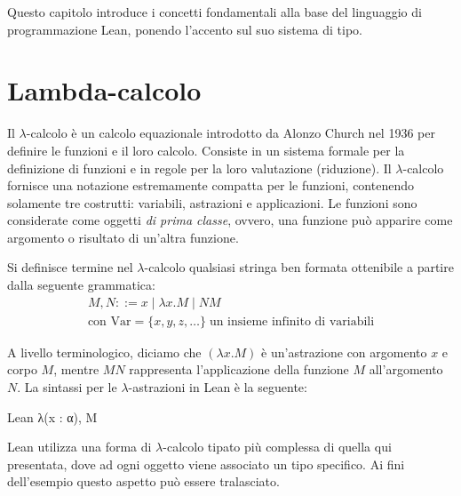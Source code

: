 Questo capitolo introduce i concetti fondamentali alla base del linguaggio di programmazione Lean, ponendo l'accento sul suo sistema di tipo.

\section{Lambda-calcolo}
\begin{comment}
Il $\lambda$-calcolo nasce come conseguenza al tentativo di fomalizzazione della nozione di algoritmo nella prima metà del '900. Uno degli obiettivi del programma di Hilbert era quello di risolvere l'\emph{Entscheidungsproblem} (problema della decisione), ovvero fornire una procedura calcolabile (un algoritmo) per determinare la verità o meno di qualsiasi proposizione formulata nel linguaggio della logica del prim'ordine. Fino a quel momento, la nozione di algoritmo non era mai stata formalizzata con precisione. La dimostrazione fornita nel 1930 da Godel circa l'incompletezza dell'aritmetica minò le basi del programma di Hilbert e condusse alla necessità di produrre una definizione formale del concetto di algoritmo: il concetto intuitivo poteva essere sufficiente per fornire algoritmi per alcuni compiti, ma per provare che che una procedura calcolabile per la risoluzione dell'\emph{Entscheidungsproblem} non poteva esistere era necessario avere una definizione chiara.
\end{comment}

Il $\lambda$-calcolo è un calcolo equazionale introdotto da Alonzo Church nel 1936 per definire le funzioni e il loro calcolo. Consiste in un sistema formale per la definizione di funzioni e in regole per la loro valutazione (riduzione). Il $\lambda$-calcolo fornisce una notazione estremamente compatta per le funzioni, contenendo solamente tre costrutti: variabili, astrazioni e applicazioni. Le funzioni sono considerate come oggetti \emph{di prima classe}, ovvero, una funzione può apparire come argomento o risultato di un'altra funzione.

Si definisce termine nel $\lambda$-calcolo qualsiasi stringa ben formata ottenibile a partire dalla seguente grammatica:
\begin{gather*}
    M,N ::= x \;|\; \lambda x.M \;|\; N M \\
    \text{con Var} = \{x, y, z, \dots\}\;\text{un insieme infinito di variabili} 
\end{gather*}

A livello terminologico, diciamo che $(\lambda x.M)$ è un'astrazione con argomento $x$ e corpo $M$, mentre $M N$ rappresenta l'applicazione della funzione $M$ all'argomento $N$.
La sintassi per le $\lambda$-astrazioni in Lean è la seguente:
\begin{code}{Lean}
λ(x : α), M
\end{code}
Lean utilizza una forma di $\lambda$-calcolo tipato più complessa di quella qui presentata, dove ad ogni oggetto viene associato un tipo specifico. Ai fini dell'esempio questo aspetto può essere tralasciato.

